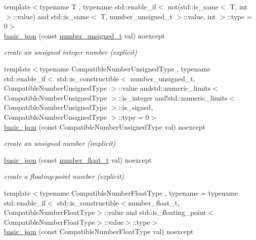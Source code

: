\begin{DoxyCompactItemize}
{\footnotesize template$<$typename T , typename std\-::enable\-\_\-if$<$ not(std\-::is\-\_\-same$<$ T, int $>$\-::value) and std\-::is\-\_\-same$<$ T, number\-\_\-unsigned\-\_\-t $>$\-::value, int $>$\-::type  = 0$>$ }\\\hyperlink{classnlohmann_1_1basic__json_a85b09b03916d3d1e73373f49cdd4136d}{basic\-\_\-json} (const \hyperlink{classnlohmann_1_1basic__json_a60a04166c122072ab11eaf9845d9cd1d}{number\-\_\-unsigned\-\_\-t} val) noexcept
\begin{DoxyCompactList}\small\item\em create an unsigned integer number (explicit) \end{DoxyCompactList}\item 
{\footnotesize template$<$typename Compatible\-Number\-Unsigned\-Type , typename std\-::enable\-\_\-if$<$ std\-::is\-\_\-constructible$<$ number\-\_\-unsigned\-\_\-t, Compatible\-Number\-Unsigned\-Type $>$\-::value andstd\-::numeric\-\_\-limits$<$ Compatible\-Number\-Unsigned\-Type $>$\-::is\-\_\-integer and!std\-::numeric\-\_\-limits$<$ Compatible\-Number\-Unsigned\-Type $>$\-::is\-\_\-signed, Compatible\-Number\-Unsigned\-Type $>$\-::type  = 0$>$ }\\\hyperlink{classnlohmann_1_1basic__json_a68a5f34b164a07b8ced13fcf2b7ec834}{basic\-\_\-json} (const Compatible\-Number\-Unsigned\-Type val) noexcept
\begin{DoxyCompactList}\small\item\em create an unsigned number (implicit) \end{DoxyCompactList}\item 
\hyperlink{classnlohmann_1_1basic__json_a2badcf191deabf579abcf8d3654da26f}{basic\-\_\-json} (const \hyperlink{classnlohmann_1_1basic__json_a74a0013e847fdc574b48f931f0e757e1}{number\-\_\-float\-\_\-t} val) noexcept
\begin{DoxyCompactList}\small\item\em create a floating-\/point number (explicit) \end{DoxyCompactList}\item 
{\footnotesize template$<$typename Compatible\-Number\-Float\-Type , typename  = typename std\-::enable\-\_\-if$<$                 std\-::is\-\_\-constructible$<$number\-\_\-float\-\_\-t, Compatible\-Number\-Float\-Type$>$\-::value and                 std\-::is\-\_\-floating\-\_\-point$<$\-Compatible\-Number\-Float\-Type$>$\-::value$>$\-::type$>$ }\\\hyperlink{classnlohmann_1_1basic__json_a4bbdfd6dd8d2e6fc9ac5d81ef61ba3fe}{basic\-\_\-json} (const Compatible\-Number\-Float\-Type val) noexcept

\end{DoxyCompactItemize}
